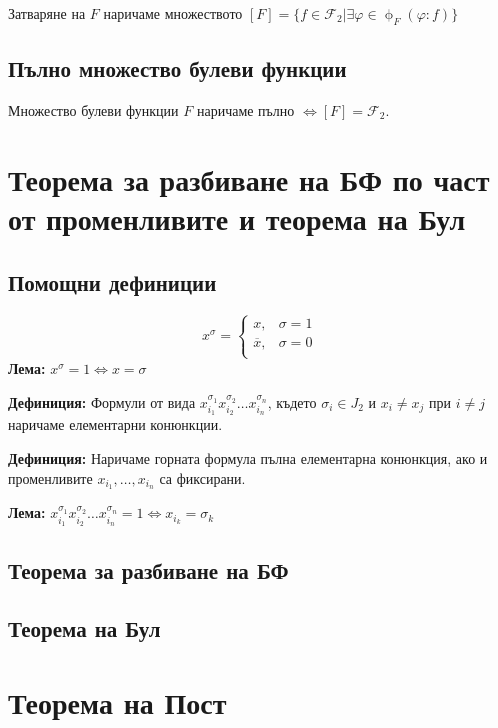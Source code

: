 \documentclass[fleqn,12pt]{article}
\begin{document}
\begin{flushleft}
Затваряне на $F$ наричаме множеството $[F] = \{ f \in \mathcal{F}_2 | \exists \varphi \in \upphi_F (\varphi : f) \}$

\subsection{Пълно множество булеви функции}
Множество булеви функции $F$ наричаме пълно $\Leftrightarrow [F] = \mathcal{F}_2$.

\section{Теорема за разбиване на БФ по част от променливите и теорема на Бул}

\subsection{Помощни дефиниции}
\[ x^\sigma = \begin{cases}
    x, & \sigma = 1 \\
    \overline{x}, & \sigma = 0 \\
\end{cases}\]
\textbf{Лема: } $x^\sigma = 1 \Leftrightarrow x = \sigma$

\textbf{Дефиниция: } Формули от вида $x_{i_1}^{\sigma_1} x_{i_2}^{\sigma_2} \dots x_{i_n}^{\sigma_n}$, където
$\sigma_i \in J_2$ и $x_i \neq x_j$ при $i \neq j$ наричаме елементарни конюнкции.
 
\textbf{Дефиниция: } Наричаме горната формула пълна елементарна конюнкция, ако и променливите $x_{i_1}, \dots, x_{i_n}$ са фиксирани.

\textbf{Лема: } $x_{i_1}^{\sigma_1} x_{i_2}^{\sigma_2} \dots x_{i_n}^{\sigma_n} = 1 \Leftrightarrow x_{i_k} = \sigma_k$

\subsection{Теорема за разбиване на БФ}

\subsection{Теорема на Бул}

\section{Теорема на Пост}


\end{flushleft}
\end{document}
